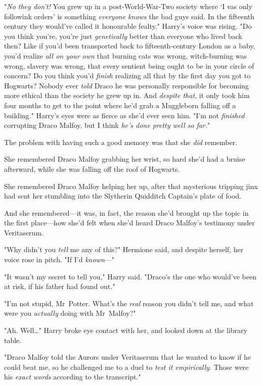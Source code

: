 "\emph{No they don't!} You grew up in a post-World-War-Two society where `I vas
only followink orders' is something \emph{everyone knows} the bad guys said. In
the fifteenth century they would've called it honourable fealty." Harry's voice
was rising. "Do you think you're, you're just \emph{genetically} better than
everyone who lived back then? Like if you'd been transported back to
fifteenth-century London as a baby, you'd realize \emph{all on your own} that
burning cats was wrong, witch-burning was wrong, slavery was wrong, that every
sentient being ought to be in your circle of concern? Do you think you'd
\emph{finish} realizing all that by the first day you got to Hogwarts? Nobody
ever \emph{told} Draco he was personally responsible for becoming more ethical
than the society he grew up in. And \emph{despite that}, it only took him four
months to get to the point where he'd grab a Muggleborn falling off a
building." Harry's eyes were as fierce as she'd ever seen him. "I'm not
\emph{finished} corrupting Draco Malfoy, but I think \emph{he's done pretty
well so far.}"

The problem with having such a good memory was that she \emph{did} remember.

She remembered Draco Malfoy grabbing her wrist, so hard she'd had a bruise
afterward, while she was falling off the roof of Hogwarts.

She remembered Draco Malfoy helping her up, after that mysterious tripping jinx
had sent her stumbling into the Slytherin Quidditch Captain's plate of food.

And she remembered---it was, in fact, the reason she'd brought up the topic in
the first place---how she'd felt when she'd heard Draco Malfoy's testimony
under Veritaserum.

"Why didn't you \emph{tell} me any of this?" Hermione said, and despite
herself, her voice rose in pitch. "If I'd \emph{known}---"

"It wasn't my secret to tell you," Harry said. "Draco's the one who would've
been at risk, if his father had found out."

"I'm not stupid, Mr~Potter. What's the \emph{real} reason you didn't tell me,
and what were you \emph{actually} doing with Mr~Malfoy?"

"Ah. Well{\ldots}" Harry broke eye contact with her, and looked down at the
library table.

"Draco Malfoy told the Aurors under Veritaserum that he wanted to know if he
could beat me, so he challenged me to a duel to \emph{test it empirically}.
Those were his \emph{exact words} according to the transcript."

